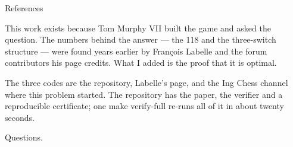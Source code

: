 \documentclass[aspectratio=169,10pt]{beamer}
\begin{document}
\begin{frame}{References}
{  This work exists because Tom Murphy VII built the game and asked the
  question. The numbers behind the answer --- the 118 and the three-switch
  structure --- were found years earlier by François Labelle and the forum
  contributors his page credits. What I added is the proof that it is
  optimal.

  The three codes are the repository, Labelle's page, and the Ing Chess
  channel where this problem started. The repository has the paper, the
  verifier and a reproducible certificate; one make verify-full re-runs all
  of it in about twenty seconds.

  Questions.}
\end{frame}
\end{document}
